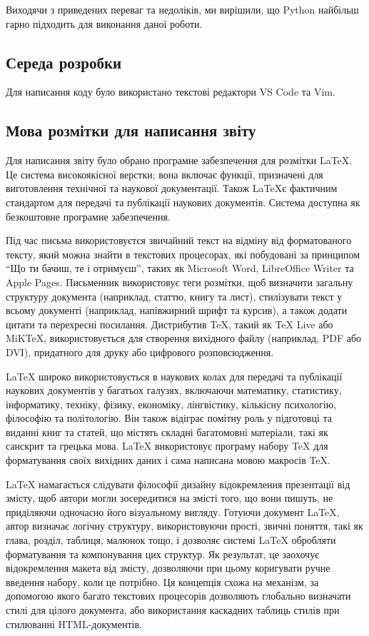 \documentclass[a4paper,14pt]{extreport}
\begin{document}
Виходячи з приведених переваг та недоліків, ми вирішили, що Python найбільш гарно підходить для виконання даної роботи.

\subsection{Середа розробки}
Для написання коду було використано текстові редактори VS Code та Vim.

\subsection{Мова розмітки для написання звіту}
Для написання звіту було обрано програмне забезпечення для розмітки \LaTeX. Це система високоякісної верстки; вона включає функції, призначені для виготовлення технічної та наукової документації. Також \LaTeX є фактичним стандартом для передачі та публікації наукових документів. Система доступна як безкоштовне програмне забезпечення.

Під час письма використовуєтся звичайний текст на відміну від форматованого тексту, який можна знайти в текстових процесорах, які побудовані за принципом ``Що ти бачиш, те і отримуєш'', таких як Microsoft Word, LibreOffice Writer та Apple Pages. Письменник використовує теги розмітки, щоб визначити загальну структуру документа (наприклад, статтю, книгу та лист), стилізувати текст у всьому документі (наприклад, напівжирний шрифт та курсив), а також додати цитати та перехресні посилання. Дистрибутив TeX, такий як TeX Live або MiKTeX, використовується для створення вихідного файлу (наприклад, PDF або DVI), придатного для друку або цифрового розповсюдження.

LaTeX широко використовується в наукових колах \cite{latex:friends} \cite{latex:oss-devs-latex} для передачі та публікації наукових документів у багатьох галузях, включаючи математику, статистику, інформатику, техніку, фізику, економіку, лінгвістику, кількісну психологію, філософію та політологію. Він також відіграє помітну роль у підготовці та виданні книг та статей, що містять складні багатомовні матеріали, такі як санскрит та грецька мова. LaTeX використовує програму набору TeX для форматування своїх вихідних даних і сама написана мовою макросів TeX.

LaTeX намагається слідувати філософії дизайну відокремлення презентації від змісту, щоб автори могли зосередитися на змісті того, що вони пишуть, не приділяючи одночасно його візуальному вигляду. Готуючи документ LaTeX, автор визначає логічну структуру, використовуючи прості, звичні поняття, такі як глава, розділ, таблиця, малюнок тощо, і дозволяє системі LaTeX обробляти форматування та компонування цих структур. Як результат, це заохочує відокремлення макета від змісту, дозволяючи при цьому коригувати ручне введення набору, коли це потрібно. Ця концепція схожа на механізм, за допомогою якого багато текстових процесорів дозволяють глобально визначати стилі для цілого документа, або використання каскадних таблиць стилів при стилюванні HTML-документів.
\end{document}
